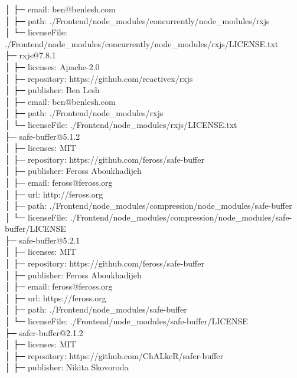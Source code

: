 \documentclass[
    paper=a4,
    twoside=false,
    parskip=half,
    listof=entryprefix,
    listof=totoc,
    index=totoc,
    bibliography=totoc,
    headsepline,
]{scrbook}
\begin{document}
    │  ├─ email: ben@benlesh.com\\
    │  ├─ path: ./Frontend/node\_modules/concurrently/node\_modules/rxjs\\
    │  └─ licenseFile: ./Frontend/node\_modules/concurrently/node\_modules/rxjs/LICENSE.txt\\
    ├─ rxjs@7.8.1\\
    │  ├─ licenses: Apache-2.0\\
    │  ├─ repository: https://github.com/reactivex/rxjs\\
    │  ├─ publisher: Ben Lesh\\
    │  ├─ email: ben@benlesh.com\\
    │  ├─ path: ./Frontend/node\_modules/rxjs\\
    │  └─ licenseFile: ./Frontend/node\_modules/rxjs/LICENSE.txt\\
    ├─ safe-buffer@5.1.2\\
    │  ├─ licenses: MIT\\
    │  ├─ repository: https://github.com/feross/safe-buffer\\
    │  ├─ publisher: Feross Aboukhadijeh\\
    │  ├─ email: feross@feross.org\\
    │  ├─ url: http://feross.org\\
    │  ├─ path: ./Frontend/node\_modules/compression/node\_modules/safe-buffer\\
    │  └─ licenseFile: ./Frontend/node\_modules/compression/node\_modules/safe-buffer/LICENSE\\
    ├─ safe-buffer@5.2.1\\
    │  ├─ licenses: MIT\\
    │  ├─ repository: https://github.com/feross/safe-buffer\\
    │  ├─ publisher: Feross Aboukhadijeh\\
    │  ├─ email: feross@feross.org\\
    │  ├─ url: https://feross.org\\
    │  ├─ path: ./Frontend/node\_modules/safe-buffer\\
    │  └─ licenseFile: ./Frontend/node\_modules/safe-buffer/LICENSE\\
    ├─ safer-buffer@2.1.2\\
    │  ├─ licenses: MIT\\
    │  ├─ repository: https://github.com/ChALkeR/safer-buffer\\
    │  ├─ publisher: Nikita Skovoroda\\
\end{document}
